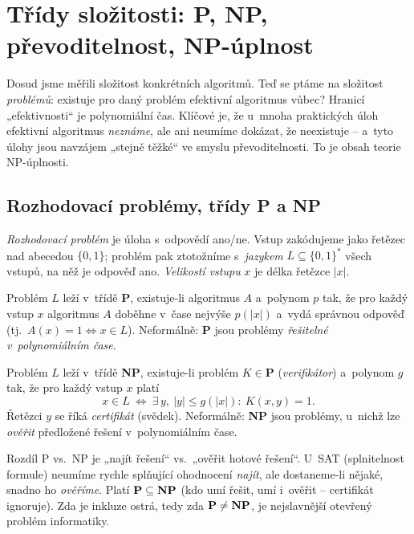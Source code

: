 \documentclass[11pt,a4paper]{article}
\begin{document}
\section{Třídy složitosti: P, NP, převoditelnost, NP-úplnost}

Dosud jsme měřili složitost konkrétních algoritmů. Teď se ptáme na složitost \emph{problémů}: existuje pro daný problém efektivní algoritmus vůbec? Hranicí „efektivnosti`` je polynomiální čas. Klíčové je, že u~mnoha praktických úloh efektivní algoritmus \emph{neznáme}, ale ani neumíme dokázat, že neexistuje -- a~tyto úlohy jsou navzájem „stejně těžké`` ve smyslu převoditelnosti. To je obsah teorie NP-úplnosti.

\subsection{Rozhodovací problémy, třídy P a NP}

\begin{definice}
\emph{Rozhodovací problém} je úloha s~odpovědí ano/ne. Vstup zakódujeme jako řetězec nad abecedou $\{0,1\}$; problém pak ztotožníme s~\emph{jazykem} $L\subseteq\{0,1\}^*$ všech vstupů, na něž je odpověď ano. \emph{Velikostí vstupu} $x$ je délka řetězce $|x|$.
\end{definice}

\begin{definice}[Třída P]
Problém $L$ leží v~třídě \textbf{P}, existuje-li algoritmus $A$ a~polynom $p$ tak, že pro každý vstup $x$ algoritmus $A$ doběhne v~čase nejvýše $p(|x|)$ a~vydá správnou odpověď (tj.\ $A(x)=1\Leftrightarrow x\in L$). Neformálně: \textbf{P} jsou problémy \emph{řešitelné v~polynomiálním čase}.
\end{definice}

\begin{definice}[Třída NP]
Problém $L$ leží v~třídě \textbf{NP}, existuje-li problém $K\in\textbf{P}$ (\emph{verifikátor}) a~polynom $g$ tak, že pro každý vstup $x$ platí
\[
x\in L\ \Longleftrightarrow\ \exists\, y,\ |y|\le g(|x|):\ K(x,y)=1 .
\]
Řetězci $y$ se říká \emph{certifikát} (svědek). Neformálně: \textbf{NP} jsou problémy, u~nichž lze \emph{ověřit} předložené řešení v~polynomiálním čase.
\end{definice}

\begin{intuice}
Rozdíl P vs.\ NP je „najít řešení`` vs.\ „ověřit hotové řešení``. U~SAT (splnitelnost formule) neumíme rychle splňující ohodnocení \emph{najít}, ale dostaneme-li nějaké, snadno ho \emph{ověříme}. Platí $\textbf P\subseteq\textbf{NP}$ (kdo umí řešit, umí i~ověřit -- certifikát ignoruje). Zda je inkluze ostrá, tedy zda $\textbf P\ne\textbf{NP}$, je nejslavnější otevřený problém informatiky.
\end{intuice}
\end{document}

